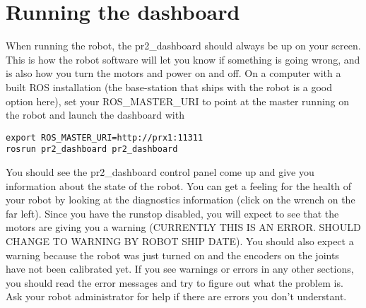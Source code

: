 \section{Running the dashboard}
When running the robot, the pr2\_dashboard should always be up on your screen.  This is how the robot software will let you know if something is going wrong, and is also how you turn the motors and power on and off.  On a computer with a built ROS installation (the base-station that ships with the robot is a good option here), set your ROS\_MASTER\_URI to point at the master running on the robot and launch the dashboard with
\begin{verbatim}
export ROS_MASTER_URI=http://prx1:11311
rosrun pr2_dashboard pr2_dashboard
\end{verbatim}
You should see the pr2\_dashboard control panel come up and give you information about the state of the robot.  You can get a feeling for the health of your robot by looking at the diagnostics information (click on the wrench on the far left).  Since you have the runstop disabled, you will expect to see that the motors are giving you a warning (CURRENTLY THIS IS AN ERROR.  SHOULD CHANGE TO WARNING BY ROBOT SHIP DATE).  You should also expect a warning because the robot was just turned on and the encoders on the joints have not been calibrated yet.
If you see warnings or errors in any other sections, you should read the error messages and try to figure out what the problem is.  Ask your robot administrator for help if there are errors you don't understant.
